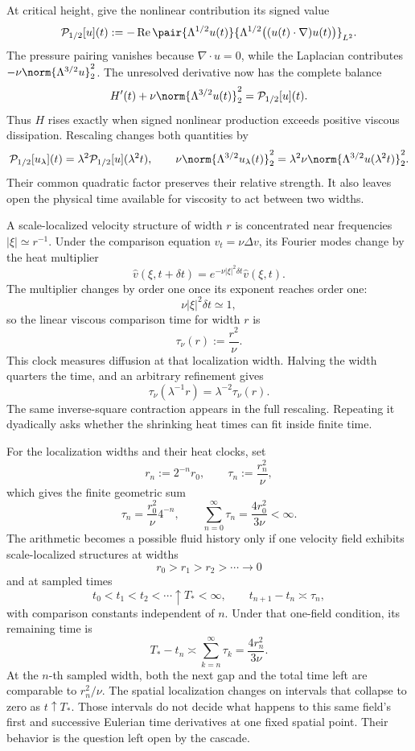 
At critical height, give the nonlinear contribution its signed value
\[
  \mathcal P_{1/2}[u](t)
  :=
  -\operatorname{Re}
  \pair
    {\Lambda^{1/2}u(t)}
    {\Lambda^{1/2}\bigl((u(t)\cdot\nabla)u(t)\bigr)}_{L^2}.
\]
The pressure pairing vanishes because \(\nabla\cdot u=0\), while the Laplacian contributes \(-\nu\norm{\Lambda^{3/2}u}_2^2\). The unresolved derivative now has the complete balance
\[
  H'(t)
  +
  \nu\norm{\Lambda^{3/2}u(t)}_2^2
  =
  \mathcal P_{1/2}[u](t).
\]
Thus \(H\) rises exactly when signed nonlinear production exceeds positive viscous dissipation. Rescaling changes both quantities by
\[
  \mathcal P_{1/2}[u_\lambda](t)
  =
  \lambda^2\mathcal P_{1/2}[u](\lambda^2t),
  \qquad
  \nu\norm{\Lambda^{3/2}u_\lambda(t)}_2^2
  =
  \lambda^2\nu\norm{\Lambda^{3/2}u(\lambda^2t)}_2^2.
\]
Their common quadratic factor preserves their relative strength. It also leaves open the physical time available for viscosity to act between two widths.


A scale-localized velocity structure of width \(r\) is concentrated near frequencies \(|\xi|\simeq r^{-1}\). Under the comparison equation \(v_t=\nu\Delta v\), its Fourier modes change by the heat multiplier
\[
  \widehat v(\xi,t+\delta t)
  =
  e^{-\nu|\xi|^2\delta t}\widehat v(\xi,t).
\]
The multiplier changes by order one once its exponent reaches order one:
\[
  \nu|\xi|^2\delta t\simeq1,
\]
so the linear viscous comparison time for width \(r\) is
\[
  \tau_\nu(r)
  :=
  \frac{r^2}{\nu}.
\]
This clock measures diffusion at that localization width. Halving the width quarters the time, and an arbitrary refinement gives
\[
  \tau_\nu(\lambda^{-1}r)
  =
  \lambda^{-2}\tau_\nu(r).
\]
The same inverse-square contraction appears in the full \NavierStokes{} rescaling. Repeating it dyadically asks whether the shrinking heat times can fit inside finite time.


For the localization widths and their heat clocks, set
\[
  r_n:=2^{-n}r_0,
  \qquad
  \tau_n:=\frac{r_n^2}{\nu},
\]
which gives the finite geometric sum
\[
  \tau_n
  =
  \frac{r_0^2}{\nu}4^{-n},
  \qquad
  \sum_{n=0}^{\infty}\tau_n
  =
  \frac{4r_0^2}{3\nu}
  <
  \infty.
\]
The arithmetic becomes a possible fluid history only if one \NavierStokes{} velocity field exhibits scale-localized structures at widths
\[
  r_0>r_1>r_2>\cdots\longrightarrow0
\]
and at sampled times
\[
  t_0<t_1<t_2<\cdots\uparrow T_*<\infty,
  \qquad
  t_{n+1}-t_n\asymp\tau_n,
\]
with comparison constants independent of \(n\). Under that one-field condition, its remaining time is
\[
  T_*-t_n
  \asymp
  \sum_{k=n}^{\infty}\tau_k
  =
  \frac{4r_n^2}{3\nu}.
\]
At the \(n\)-th sampled width, both the next gap and the total time left are comparable to \(r_n^2/\nu\). The spatial localization changes on intervals that collapse to zero as \(t\uparrow T_*\). Those intervals do not decide what happens to this same field's first and successive Eulerian time derivatives at one fixed spatial point. Their behavior is the question left open by the cascade.
